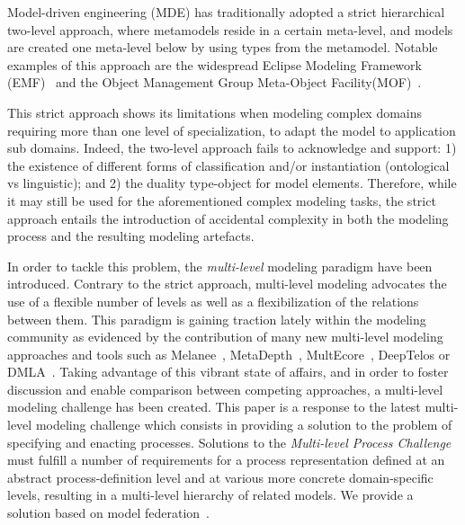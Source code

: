 Model-driven engineering (MDE) has traditionally adopted a strict hierarchical two-level approach, where metamodels reside in a certain meta-level, and models are created one meta-level below by using types from the metamodel. Notable examples of this approach are the widespread Eclipse Modeling Framework (EMF)~\citep{emf} and the Object Management Group Meta-Object Facility(MOF)~\citep{omg2013mof}.

This strict approach shows its limitations when modeling complex domains requiring more than one level of specialization, \eg to adapt the model to application sub domains. Indeed, the two-level approach fails to acknowledge and support: 1) the existence of different forms of classification and/or instantiation (\eg ontological vs linguistic); and 2) the duality type-object for model elements. Therefore, while it may still be used for the aforementioned complex modeling tasks, the strict approach entails the introduction of accidental complexity in both the modeling process and the resulting modeling artefacts. 

In order to tackle this problem, the \emph{multi-level} modeling paradigm have been introduced. Contrary to the strict approach, multi-level modeling advocates the use of a flexible number of levels as well as a flexibilization of the relations between them. This paradigm is gaining traction lately within the modeling community as evidenced by the contribution of many new multi-level modeling approaches and tools such as Melanee~\citep{melanee}, MetaDepth~\citep{metadepth}, MultEcore~\citep{multecore2016}, DeepTelos\citep{deeptelos2016} or DMLA~\citep{dmla2017}. Taking advantage of this vibrant state of affairs, and in order to foster discussion and enable comparison between competing approaches, a multi-level modeling challenge has been created. This paper is a response to the latest multi-level modeling challenge
which consists in providing a solution to the problem of specifying and enacting processes. Solutions to the \emph{Multi-level Process Challenge} must fulfill a number of requirements for a process representation defined at an abstract process-definition level and at various more concrete domain-specific levels, resulting in a multi-level hierarchy of related models. We provide a solution based on model federation~\citep{Golra2016-federation}.


